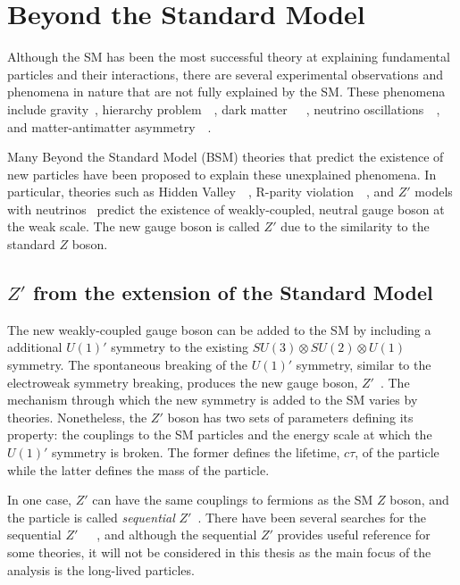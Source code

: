\section{Beyond the Standard Model}
\label{sec:intro:bsm}

Although the SM has been the most successful theory at explaining fundamental particles and their interactions, there are several experimental observations and phenomena in nature that are not fully explained by the SM. These phenomena include gravity~\cite{PhysRevD.69.105009}, hierarchy problem~\cite{ARKANIHAMED1998263}~\cite{MAGG198061}, dark matter~\cite{navarro1996structure}~\cite{bertone2005particle}~\cite{clowe2006direct}, neutrino oscillations~\cite{ahn2003indications}~\cite{mikheev1985resonance}, and matter-antimatter asymmetry~\cite{toussaint1979matter}~\cite{dine2003origin}. 

Many Beyond the Standard Model (BSM) theories that predict the existence of new particles have been proposed to explain these unexplained phenomena. In particular, theories such as Hidden Valley~\cite{strassler2007echoes}~\cite{cassel2010electroweak}, R-parity violation~\cite{senjanovic1975exact}~\cite{mohapatra1981neutrino}, and $Z'$ models with neutrinos~\cite{Basso:2008iv} predict the existence of weakly-coupled, neutral gauge boson at the weak scale. The new gauge boson is called $Z'$ due to the similarity to the standard $Z$ boson. 

\subsection{\texorpdfstring{$Z'$}{Z'} from the extension of the Standard Model}
\label{sec:intro:zprime_extension}

The new weakly-coupled gauge boson can be added to the SM by including a additional $U(1)'$ symmetry to the existing $SU(3) \otimes SU(2) \otimes U(1)$ symmetry. The spontaneous breaking of the $U(1)'$ symmetry, similar to the electroweak symmetry breaking, produces the new gauge boson, $Z'$~\cite{Langacker:2008yv}. The mechanism through which the new symmetry is added to the SM varies by theories. Nonetheless, the $Z'$ boson has two sets of parameters defining its property: the couplings to the SM particles and the energy scale at which the $U(1)'$ symmetry is broken. The former defines the lifetime, $c\tau$, of the particle while the latter defines the mass of the particle.

In one case, $Z'$ can have the same couplings to fermions as the SM $Z$ boson, and the particle is called \textit{sequential} $Z'$~\cite{BARGER1980377}. There have been several searches for the sequential $Z'$~\cite{PhysRevD.86.095010}~\cite{ABAZOV201188}~\cite{PhysRevD.90.052005}, and although the sequential $Z'$ provides useful reference for some theories, it will not be considered in this thesis as the main focus of the analysis is the long-lived particles.


